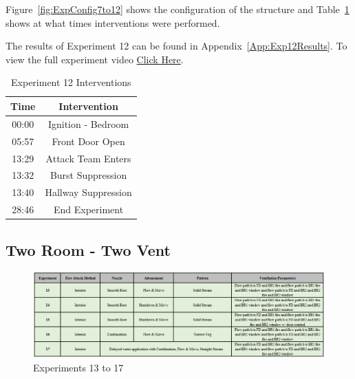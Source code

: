 \documentclass[12pt,oneside]{book}
\begin{document}
Figure~\ref{fig:ExpConfig7to12} shows the configuration of the structure and Table~\ref{Table:Exp12Interventions} shows at what times interventions were performed. 

The results of Experiment 12 can be found in Appendix~\ref{App:Exp12Results}. To view the full experiment video \href{https://youtu.be/gl8rc1Nsl1k}{Click Here}.

\begin{table}[H]
	\centering
	\caption{Experiment 12 Interventions}
	\begin{tabular}{|c|c|} 
		\hline
		Time & Intervention \\ \hline \hline
		00:00 & Ignition - Bedroom \\ \hline
		05:57 & Front Door Open \\ \hline
		13:29 & Attack Team Enters\\ \hline
		13:32 & Burst Suppression \\ \hline 
		13:40 & Hallway Suppression \\ \hline
		28:46 & End Experiment\\ \hline
	\end{tabular}
	\label{Table:Exp12Interventions}
\end{table}

\clearpage

\subsection{Two Room - Two Vent}

\begin{figure}[H]
	\centering
	\includegraphics[width=7in]{Figures/General/Exp13to17.png}
	\caption{Experiments 13 to 17}
	\label{fig:Exp13to17}
\end{figure}
\end{document}
